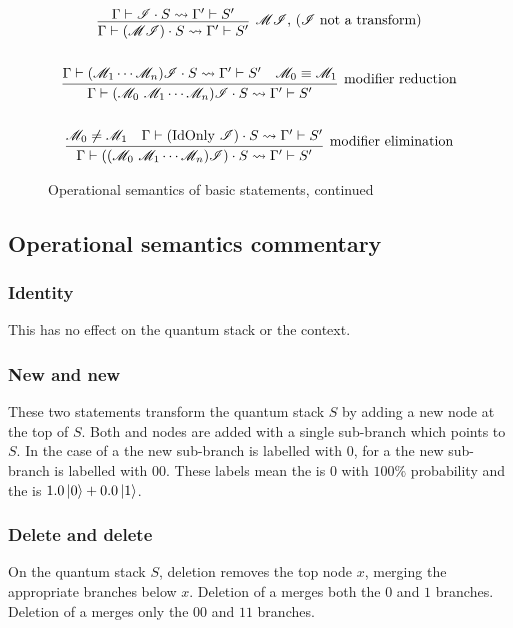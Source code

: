 \begin{figure}[htbp]
\[\begin{gathered}
\\
\infer[\raisebox{1ex}{\qmod \qins, (\qins{} not a transform)}]
   { \qresultsin{\Gamma\qentail
         \qop{(\qmod \qins)}{S}}
         {\Gamma'\qentail S'}}
    {\qresultsin{\Gamma\qentail \qop{\qins}{S}}
           {\Gamma'\qentail S'}}\\
\\
\infer[\raisebox{2ex}{modifier reduction}]
   { \qresultsin{\Gamma\qentail
         \qop{(\qmod_0\ \qmod_1\cdots\qmod_n)\qins}{S}}
         {\Gamma'\qentail S'}}
    {\qresultsin{\Gamma\qentail \qop{(\qmod_1\cdots\qmod_n)\qins}{S}}
           {\Gamma'\qentail S'} & \qmod_0 \equiv \qmod_1}\\
\\
\infer[\raisebox{2ex}{modifier elimination}]
   { \qresultsin{\Gamma\qentail
         \qop{((\qmod_0\ \qmod_1\cdots\qmod_n)\qins)}{S}}
         {\Gamma'\qentail S'}}
    {\qmod_0 \neq \qmod_1 &
        \qresultsin{\Gamma\qentail \qop{(\text{IdOnly }\qins)}{S}}
           {\Gamma'\qentail S'} }
\end{gathered}
\]
\caption{Operational semantics of basic \lqpl{} statements, continued}\label{fig:qsstatementtransitionsparttwo}
\end{figure}

\subsection{Operational semantics commentary}\label{subsec:operationalsemanticscommentary}
\subsubsection{Identity}
This has no effect on  the quantum stack or the context.

\subsubsection{New \bit{} and new \qbit}
These two statements transform the quantum stack $S$ by adding a 
new node at the top of $S$.
 Both \bit{} and \qbit{} nodes are added with a single 
sub-branch which points to $S$. In the case of
a \bit{} the new sub-branch is labelled with $0$, for a \qbit{} the
new sub-branch is labelled with $00$. These
labels mean the \bit{} is $0$ with $100\%$ probability and the 
\qbit{} is $1.0 \left\vert{0}\right\rangle + 0.0 \left\vert{1}\right\rangle$.


\subsubsection{Delete \bit{} and delete \qbit}
On the quantum stack $S$, deletion removes  the top node $x$, merging
 the appropriate branches below $x$. Deletion of a \bit{} merges
both the $0$ and $1$ branches. Deletion of a 
\qbit{} merges only the $00$ and $11$ branches.


